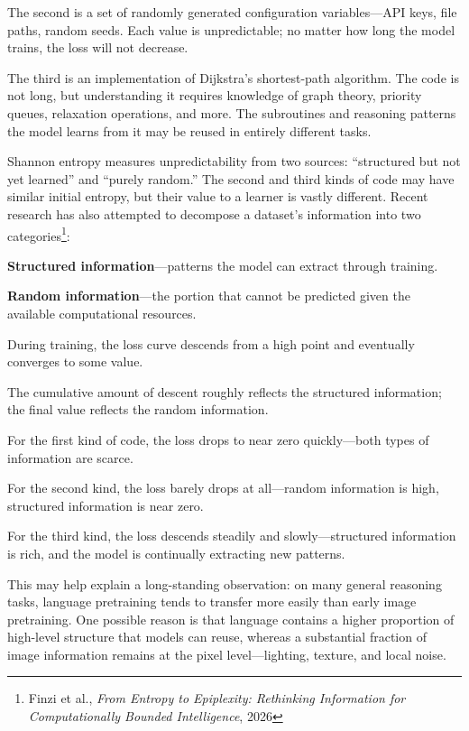 The second is a set of randomly generated configuration variables---API keys, file paths, random seeds. Each value is unpredictable; no matter how long the model trains, the loss will not decrease.

The third is an implementation of Dijkstra's shortest-path algorithm. The code is not long, but understanding it requires knowledge of graph theory, priority queues, relaxation operations, and more. The subroutines and reasoning patterns the model learns from it may be reused in entirely different tasks.

\vspace{1em}

Shannon entropy measures unpredictability from two sources: ``structured but not yet learned'' and ``purely random.'' The second and third kinds of code may have similar initial entropy, but their value to a learner is vastly different. Recent research has also attempted to decompose a dataset's information into two categories\footnote{Finzi et al., \textit{From Entropy to Epiplexity: Rethinking Information for Computationally Bounded Intelligence}, 2026}:

\textbf{Structured information}---patterns the model can extract through training.

\textbf{Random information}---the portion that cannot be predicted given the available computational resources.

\vspace{1em}

During training, the loss curve descends from a high point and eventually converges to some value.

The cumulative amount of descent roughly reflects the structured information; the final value reflects the random information.

For the first kind of code, the loss drops to near zero quickly---both types of information are scarce.

For the second kind, the loss barely drops at all---random information is high, structured information is near zero.

For the third kind, the loss descends steadily and slowly---structured information is rich, and the model is continually extracting new patterns.

\vspace{1em}

This may help explain a long-standing observation: on many general reasoning tasks, language pretraining tends to transfer more easily than early image pretraining. One possible reason is that language contains a higher proportion of high-level structure that models can reuse, whereas a substantial fraction of image information remains at the pixel level---lighting, texture, and local noise.

